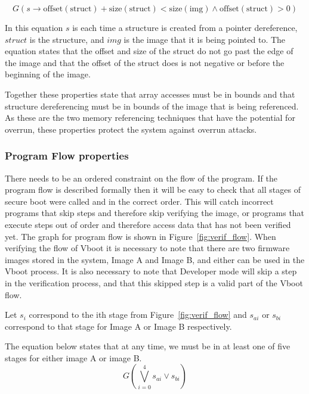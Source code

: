 \documentclass[../report.tex]{subfiles}
\begin{document}
\begin{equation}
    G(s \to \text{offset}(\text{struct}) + \text{size}(\text{struct}) <
    \text{size}(\text{img}) \land \text{offset}(\text{struct}) > 0)
\end{equation}

In this equation $s$ is each time a structure is created from a pointer dereference, $struct$ is the structure, and $img$ is the image that it is being pointed to.
The equation states that the offset and size of the struct do not go past the edge of the image and that the offset of the struct does is not negative or before the beginning of the image.

Together these properties state that array accesses must be in bounds and that structure dereferencing must be in bounds of the image that is being referenced.
As these are the two memory referencing techniques that have the potential for overrun, these properties protect the system against overrun attacks.

\subsubsection{Program Flow properties}

There needs to be an ordered constraint on the flow of the program. 
If the program flow is described formally then it will be easy to check that all stages of secure boot were called and in the correct order.
This will catch incorrect programs that skip steps and therefore skip verifying the image, or programs that execute steps out of order and therefore access data that has not been verified yet.
The graph for program flow is shown in Figure~\ref{fig:verif_flow}.
When verifying the flow of Vboot it is necessary to note that there are two firmware images stored in the system, Image A and Image B, and either can be used in the Vboot process. 
It is also necessary to note that Developer mode will skip a step in the verification process, and that this skipped step is a valid part of the Vboot flow.

Let $s_i$ correspond to the ith stage from Figure~\ref{fig:verif_flow} and $s_{ai}$ or $s_{bi}$ correspond to that stage for Image A or Image B respectively.

The equation below states that at any time, we must be in at least one of five stages for either image A or image B.
\begin{equation}
    G(\bigvee\limits_{i = 0}^{4} s_{ai} \lor s_{bi})
\end{equation}
\end{document}
